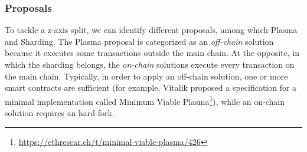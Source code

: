 \subsubsection{Proposals} To tackle a z-axis split, we can identify different
proposals, among which Plasma and Sharding. The Plasma proposal is
categorized as an \emph{off-chain} solution because it executes some
transactions outside the main chain. At the opposite, in which the sharding
belongs, the \emph{on-chain} solutions execute every transaction on the main
chain. Typically, in order to apply an off-chain solution, one or more smart
contracts are sufficient (for example, Vitalik proposed a specification for a
minimal implementation called Minimum Viable
Plasma\footnote{\url{https://ethresear.ch/t/minimal-viable-plasma/426}}), while
an on-chain solution requires an hard-fork.

